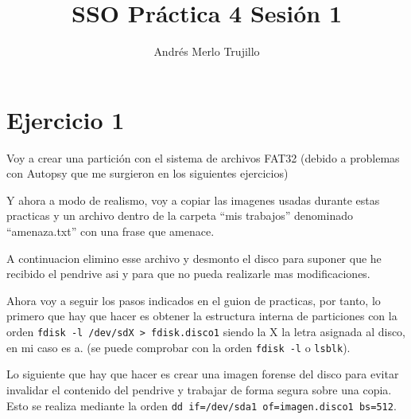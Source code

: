 \documentclass{article}
\title{SSO Práctica 4 Sesión 1}
\author{Andrés Merlo Trujillo}
\date{}
\begin{document}
\maketitle

\tableofcontents

\newpage

\section*{Ejercicio 1}

Voy a crear una partición con el sistema de archivos FAT32 (debido a problemas con Autopsy que me surgieron en los siguientes ejercicios)

Y ahora a modo de realismo, voy a copiar las imagenes usadas durante estas practicas y un archivo dentro de la carpeta ``mis trabajos'' denominado ``amenaza.txt'' con una frase que amenace.


A continuacion elimino esse archivo y desmonto el disco para suponer que he recibido el pendrive asi y para que no pueda realizarle mas modificaciones.

Ahora voy a seguir los pasos indicados en el guion de practicas, por tanto, lo primero que hay que hacer es obtener la estructura interna de particiones con la orden \verb|fdisk -l /dev/sdX > fdisk.disco1| siendo la X la letra asignada al disco, en mi caso es a. (se puede comprobar con la orden \verb|fdisk -l| o \verb|lsblk|).


Lo siguiente que hay que hacer es crear una imagen forense del disco para evitar invalidar el contenido del pendrive y trabajar de forma segura sobre una copia. Esto se realiza mediante la orden \verb|dd if=/dev/sda1 of=imagen.disco1 bs=512|.

\end{document}
